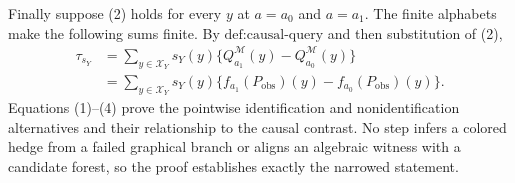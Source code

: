 Finally suppose (2) holds for every \(y\) at \(a=a_0\) and \(a=a_1\). The finite alphabets make the following sums finite. By \(\text{def:causal-query}\) and then substitution of (2),
\[
\begin{aligned}
\tau_{s_Y}
&=\sum_{y\in\mathcal X_Y}s_Y(y)
  \{Q_{a_1}^{\mathcal M}(y)-Q_{a_0}^{\mathcal M}(y)\}\\
&=\sum_{y\in\mathcal X_Y}s_Y(y)
  \{f_{a_1}(P_{\mathrm{obs}})(y)-f_{a_0}(P_{\mathrm{obs}})(y)\}.
\end{aligned}
\tag{4}
\]
Equations (1)--(4) prove the pointwise identification and nonidentification alternatives and their relationship to the causal contrast. No step infers a colored hedge from a failed graphical branch or aligns an algebraic witness with a candidate forest, so the proof establishes exactly the narrowed statement.